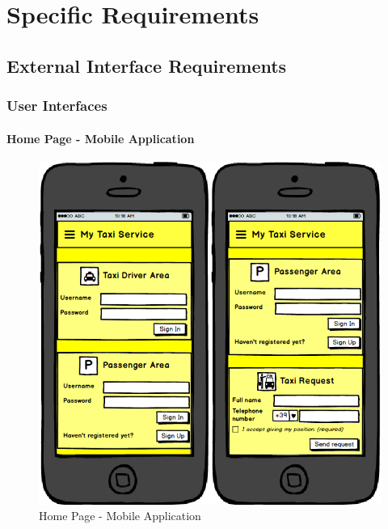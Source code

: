 \section{Specific Requirements}
	\subsection{External Interface Requirements}
		\subsubsection{User Interfaces}
		\begin{description}
			\paragraph{Home Page - Mobile Application}
			\begin{figure}[!h]
				\begin{center}					
				\includegraphics[scale=0.5]{../SE2_MOCKUPS/MobileAppHomePage.png}
				\caption{Home Page - Mobile Application}
				\end{center}	
			\end{figure}
		\end{description}
		
		\newpage
